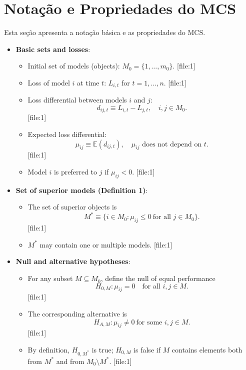\section{Notação e Propriedades do MCS}

Esta seção apresenta a notação básica e as propriedades do MCS.

\begin{itemize}


  \item \textbf{Basic sets and losses}:
    \begin{itemize}
      \item Initial set of models (objects): $M_0 = \{1,\dots,m_0\}$. [file:1]
      \item Loss of model $i$ at time $t$: $L_{i,t}$ for $t=1,\dots,n$. [file:1]
      \item Loss differential between models $i$ and $j$:
        \[
          d_{ij,t} \equiv L_{i,t} - L_{j,t}, \quad i,j \in M_0.
        \] [file:1]
      \item Expected loss differential:
        \[
          \mu_{ij} \equiv \mathbb{E}(d_{ij,t}), \quad \mu_{ij} \text{ does not depend on } t.
        \] [file:1]
      \item Model $i$ is preferred to $j$ if $\mu_{ij} < 0$. [file:1]
    \end{itemize}

  \item \textbf{Set of superior models (Definition 1)}:
    \begin{itemize}
      \item The set of superior objects is
        \[
          M^\ast \equiv \bigl\{ i \in M_0 : \mu_{ij} \le 0 \ \text{for all } j \in M_0 \bigr\}.
        \] [file:1]
      \item $M^\ast$ may contain one or multiple models. [file:1]
    \end{itemize}

  \item \textbf{Null and alternative hypotheses}:
    \begin{itemize}
      \item For any subset $M \subseteq M_0$, define the null of equal performance
        \[
          H_{0,M} : \mu_{ij} = 0 \quad \text{for all } i,j \in M.
        \] [file:1]
      \item The corresponding alternative is
        \[
          H_{A,M}: \mu_{ij} \neq 0 \ \text{for some } i,j \in M.
        \] [file:1]
      \item By definition, $H_{0,M^\ast}$ is true; $H_{0,M}$ is false if $M$ contains elements both from $M^\ast$ and from $M_0 \setminus M^\ast$. [file:1]
    \end{itemize}


\end{itemize}
